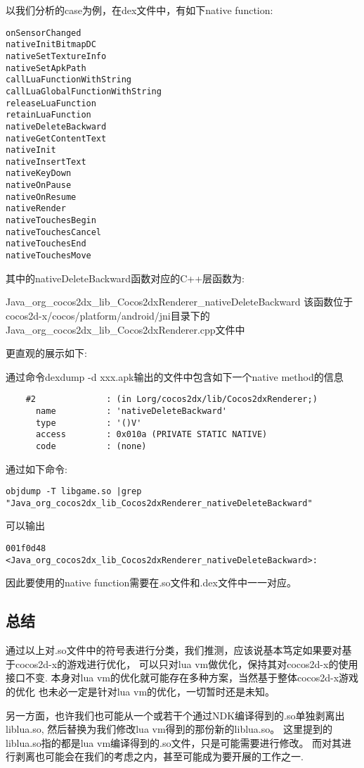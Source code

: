 以我们分析的case为例，在dex文件中，有如下native function:
\begin{lstlisting}
onSensorChanged
nativeInitBitmapDC
nativeSetTextureInfo
nativeSetApkPath
callLuaFunctionWithString
callLuaGlobalFunctionWithString
releaseLuaFunction
retainLuaFunction
nativeDeleteBackward
nativeGetContentText
nativeInit
nativeInsertText
nativeKeyDown
nativeOnPause
nativeOnResume
nativeRender
nativeTouchesBegin
nativeTouchesCancel
nativeTouchesEnd
nativeTouchesMove
\end{lstlisting}

其中的nativeDeleteBackward函数对应的C++层函数为:

Java\_org\_cocos2dx\_lib\_Cocos2dxRenderer\_nativeDeleteBackward
该函数位于cocos2d-x/cocos/platform/android/jni目录下的\\
Java\_org\_cocos2dx\_lib\_Cocos2dxRenderer.cpp文件中

更直观的展示如下:

通过命令dexdump -d xxx.apk输出的文件中包含如下一个native method的信息
\begin{lstlisting}
    #2              : (in Lorg/cocos2dx/lib/Cocos2dxRenderer;)
      name          : 'nativeDeleteBackward'
      type          : '()V'
      access        : 0x010a (PRIVATE STATIC NATIVE)
      code          : (none)
\end{lstlisting}

通过如下命令:
\begin{lstlisting}
objdump -T libgame.so |grep "Java_org_cocos2dx_lib_Cocos2dxRenderer_nativeDeleteBackward"
\end{lstlisting}

可以输出
\begin{lstlisting}
001f0d48 <Java_org_cocos2dx_lib_Cocos2dxRenderer_nativeDeleteBackward>:
\end{lstlisting}

因此要使用的native function需要在.so文件和.dex文件中一一对应。

\subsection{总结}
\label{sec:so:conclusion}
通过以上对.so文件中的符号表进行分类，我们推测，应该说基本笃定如果要对基于cocos2d-x的游戏进行优化，
可以只对lua vm做优化，保持其对cocos2d-x的使用接口不变.
本身对lua vm的优化就可能存在多种方案，当然基于整体cocos2d-x游戏的优化
也未必一定是针对lua vm的优化，一切暂时还是未知。

另一方面，也许我们也可能从一个或若干个通过NDK编译得到的.so单独剥离出liblua.so,
然后替换为我们修改lua vm得到的那份新的liblua.so。
这里提到的liblua.so指的都是lua vm编译得到的.so文件，只是可能需要进行修改。
而对其进行剥离也可能会在我们的考虑之内，甚至可能成为要开展的工作之一.\\


